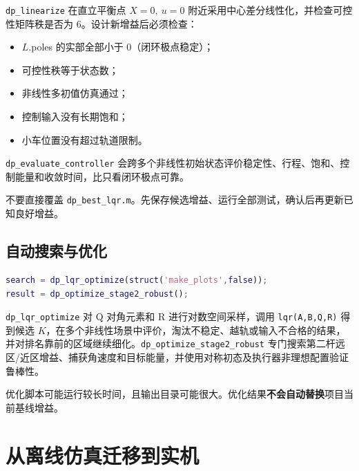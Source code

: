 \documentclass[12pt,a4paper]{article}
\begin{document}
\texttt{dp\_linearize} 在直立平衡点 $X=0,\ u=0$ 附近采用中心差分线性化，并检查可控性矩阵秩是否为 6。设计新增益后必须检查：

\begin{itemize}
    \item $L$.poles 的实部全部小于 0（闭环极点稳定）；
    \item 可控性秩等于状态数；
    \item 非线性多初值仿真通过；
    \item 控制输入没有长期饱和；
    \item 小车位置没有超过轨道限制。
\end{itemize}

\texttt{dp\_evaluate\_controller} 会跨多个非线性初始状态评价稳定性、行程、饱和、控制能量和收敛时间，比只看闭环极点可靠。

\begin{tipbox}
    不要直接覆盖 \texttt{dp\_best\_lqr.m}。先保存候选增益、运行全部测试，确认后再更新已知良好增益。
\end{tipbox}

\subsection{自动搜索与优化}

\begin{lstlisting}[language=Matlab, caption={LQR 权重自动搜索（运行时间较长）}, label={lst:search}]
search = dp_lqr_optimize(struct('make_plots',false));
result = dp_optimize_stage2_robust();
\end{lstlisting}

\texttt{dp\_lqr\_optimize} 对 Q 对角元素和 R 进行对数空间采样，调用 \texttt{lqr(A,B,Q,R)} 得到候选 $K$，在多个非线性场景中评价，淘汰不稳定、越轨或输入不合格的结果，并对排名靠前的区域继续细化。\texttt{dp\_optimize\_stage2\_robust} 专门搜索第二杆远区/近区增益、捕获角速度和目标能量，并使用对称初态及执行器非理想配置验证鲁棒性。

\begin{warnbox}
    优化脚本可能运行较长时间，且输出目录可能很大。优化结果\textbf{不会自动替换}项目当前基线增益。
\end{warnbox}

\section{从离线仿真迁移到实机}
\label{sec:migration}
\end{document}
